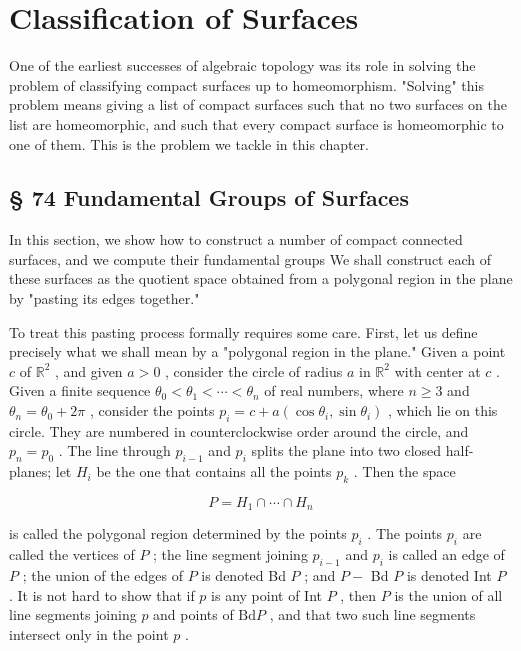 \chapter{Classification of Surfaces}

One of the earliest successes of algebraic topology was its role in solving the problem of classifying compact surfaces up to homeomorphism. "Solving" this problem means giving a list of compact surfaces such that no two surfaces on the list are homeomorphic, and such that every compact surface is homeomorphic to one of them. This is the problem we tackle in this chapter.

\section*{§ 74 Fundamental Groups of Surfaces}

In this section, we show how to construct a number of compact connected surfaces, and we compute their fundamental groups We shall construct each of these surfaces as the quotient space obtained from a polygonal region in the plane by "pasting its edges together."

To treat this pasting process formally requires some care. First, let us define precisely what we shall mean by a "polygonal region in the plane." Given a point \(c\) of \({\mathbb{R}}^{2}\) , and given \(a > 0\) , consider the circle of radius \(a\) in \({\mathbb{R}}^{2}\) with center at \(c\) . Given a finite sequence \({\theta }_{0} < {\theta }_{1} < \cdots  < {\theta }_{n}\) of real numbers, where \(n \geq  3\) and \({\theta }_{n} = {\theta }_{0} + {2\pi }\) , consider the points \({p}_{i} = c + a\left( {\cos {\theta }_{i},\sin {\theta }_{i}}\right)\) , which lie on this circle. They are numbered in counterclockwise order around the circle, and \({p}_{n} = {p}_{0}\) . The line through \({p}_{i - 1}\) and \({p}_{i}\) splits the plane into two closed half-planes; let \({H}_{i}\) be the one that contains all the points \({p}_{k}\) . Then the space

\[
P = {H}_{1} \cap  \cdots  \cap  {H}_{n}
\]

is called the polygonal region determined by the points \({p}_{i}\) . The points \({p}_{i}\) are called the vertices of \(P\) ; the line segment joining \({p}_{i - 1}\) and \({p}_{i}\) is called an edge of \(P\) ; the union of the edges of \(P\) is denoted Bd \(P\) ; and \(P -\) Bd \(P\) is denoted Int \(P\) . It is not hard to show that if \(p\) is any point of Int \(P\) , then \(P\) is the union of all line segments joining \(p\) and points of \(\mathrm{{Bd}}P\) , and that two such line segments intersect only in the point \(p\) .

